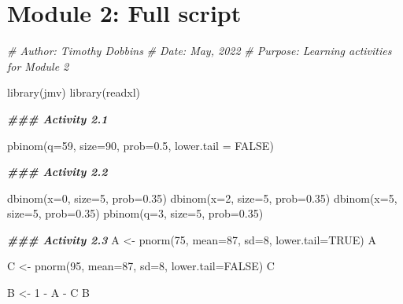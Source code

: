 \documentclass[
]{memoir}
\newenvironment{Shaded}{\begin{snugshade}}{\end{snugshade}}
\newcommand{\AttributeTok}[1]{\textcolor[rgb]{0.77,0.63,0.00}{#1}}
\newcommand{\CommentTok}[1]{\textcolor[rgb]{0.56,0.35,0.01}{\textit{#1}}}
\newcommand{\ConstantTok}[1]{\textcolor[rgb]{0.00,0.00,0.00}{#1}}
\newcommand{\DecValTok}[1]{\textcolor[rgb]{0.00,0.00,0.81}{#1}}
\newcommand{\DocumentationTok}[1]{\textcolor[rgb]{0.56,0.35,0.01}{\textbf{\textit{#1}}}}
\newcommand{\FloatTok}[1]{\textcolor[rgb]{0.00,0.00,0.81}{#1}}
\newcommand{\FunctionTok}[1]{\textcolor[rgb]{0.00,0.00,0.00}{#1}}
\newcommand{\NormalTok}[1]{#1}
\newcommand{\OtherTok}[1]{\textcolor[rgb]{0.56,0.35,0.01}{#1}}
\newcommand{\SpecialCharTok}[1]{\textcolor[rgb]{0.00,0.00,0.00}{#1}}
\begin{document}
\hypertarget{module-2-full-script}{%
\chapter*{Module 2: Full script}\label{module-2-full-script}}

\begin{Shaded}
\begin{Highlighting}[]
\CommentTok{\# Author: Timothy Dobbins}
\CommentTok{\# Date: May, 2022}
\CommentTok{\# Purpose: Learning activities for Module 2}

\FunctionTok{library}\NormalTok{(jmv)}
\FunctionTok{library}\NormalTok{(readxl)}

\DocumentationTok{\#\#\# Activity 2.1}

\FunctionTok{pbinom}\NormalTok{(}\AttributeTok{q=}\DecValTok{59}\NormalTok{, }\AttributeTok{size=}\DecValTok{90}\NormalTok{, }\AttributeTok{prob=}\FloatTok{0.5}\NormalTok{, }\AttributeTok{lower.tail =} \ConstantTok{FALSE}\NormalTok{)}


\DocumentationTok{\#\#\# Activity 2.2}

\FunctionTok{dbinom}\NormalTok{(}\AttributeTok{x=}\DecValTok{0}\NormalTok{, }\AttributeTok{size=}\DecValTok{5}\NormalTok{, }\AttributeTok{prob=}\FloatTok{0.35}\NormalTok{)}
\FunctionTok{dbinom}\NormalTok{(}\AttributeTok{x=}\DecValTok{2}\NormalTok{, }\AttributeTok{size=}\DecValTok{5}\NormalTok{, }\AttributeTok{prob=}\FloatTok{0.35}\NormalTok{)}
\FunctionTok{dbinom}\NormalTok{(}\AttributeTok{x=}\DecValTok{5}\NormalTok{, }\AttributeTok{size=}\DecValTok{5}\NormalTok{, }\AttributeTok{prob=}\FloatTok{0.35}\NormalTok{)}
\FunctionTok{pbinom}\NormalTok{(}\AttributeTok{q=}\DecValTok{3}\NormalTok{, }\AttributeTok{size=}\DecValTok{5}\NormalTok{, }\AttributeTok{prob=}\FloatTok{0.35}\NormalTok{)}


\DocumentationTok{\#\#\# Activity 2.3}
\NormalTok{A }\OtherTok{\textless{}{-}} \FunctionTok{pnorm}\NormalTok{(}\DecValTok{75}\NormalTok{, }\AttributeTok{mean=}\DecValTok{87}\NormalTok{, }\AttributeTok{sd=}\DecValTok{8}\NormalTok{, }\AttributeTok{lower.tail=}\ConstantTok{TRUE}\NormalTok{)}
\NormalTok{A}

\NormalTok{C }\OtherTok{\textless{}{-}} \FunctionTok{pnorm}\NormalTok{(}\DecValTok{95}\NormalTok{, }\AttributeTok{mean=}\DecValTok{87}\NormalTok{, }\AttributeTok{sd=}\DecValTok{8}\NormalTok{, }\AttributeTok{lower.tail=}\ConstantTok{FALSE}\NormalTok{)   }
\NormalTok{C}

\NormalTok{B }\OtherTok{\textless{}{-}} \DecValTok{1} \SpecialCharTok{{-}}\NormalTok{ A }\SpecialCharTok{{-}}\NormalTok{ C}
\NormalTok{B}



\end{Highlighting}
\end{Shaded}
\end{document}
